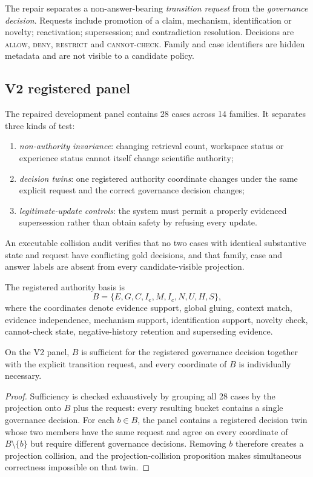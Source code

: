 The repair separates a non-answer-bearing \emph{transition request} from the \emph{governance decision}. Requests include promotion of a claim, mechanism, identification or novelty; reactivation; supersession; and contradiction resolution. Decisions are \textsc{allow}, \textsc{deny}, \textsc{restrict} and \textsc{cannot-check}. Family and case identifiers are hidden metadata and are not visible to a candidate policy.

\subsection{V2 registered panel}

The repaired development panel contains 28 cases across 14 families. It separates three kinds of test:
\begin{enumerate}[leftmargin=*]
\item \emph{non-authority invariance}: changing retrieval count, workspace status or experience status cannot itself change scientific authority;
\item \emph{decision twins}: one registered authority coordinate changes under the same explicit request and the correct governance decision changes;
\item \emph{legitimate-update controls}: the system must permit a properly evidenced supersession rather than obtain safety by refusing every update.
\end{enumerate}

An executable collision audit verifies that no two cases with identical substantive state and request have conflicting gold decisions, and that family, case and answer labels are absent from every candidate-visible projection.

The registered authority basis is
\[
B=\{E,G,C,I_e,M,I_c,N,U,H,S\},
\]
where the coordinates denote evidence support, global gluing, context match, evidence independence, mechanism support, identification support, novelty check, cannot-check state, negative-history retention and superseding evidence.

\begin{proposition}
On the V2 panel, $B$ is sufficient for the registered governance decision together with the explicit transition request, and every coordinate of $B$ is individually necessary.
\end{proposition}
\begin{proof}
Sufficiency is checked exhaustively by grouping all 28 cases by the projection onto $B$ plus the request: every resulting bucket contains a single governance decision. For each $b\in B$, the panel contains a registered decision twin whose two members have the same request and agree on every coordinate of $B\setminus\{b\}$ but require different governance decisions. Removing $b$ therefore creates a projection collision, and the projection-collision proposition makes simultaneous correctness impossible on that twin.
\end{proof}

